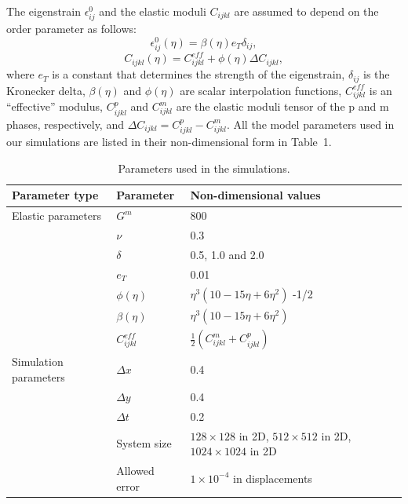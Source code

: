 The eigenstrain $\epsilon_{ij}^{0}$ and the elastic moduli $C_{ijkl}$ are assumed to depend on the order parameter as follows:
\begin{equation}
\epsilon_{ij}^{0}(\eta)=\beta(\eta)e_T\delta_{ij},
\end{equation}
\begin{equation}
C_{ijkl}(\eta)=C_{ijkl}^{eff}+\phi(\eta)\Delta C_{ijkl},
\end{equation}
where $e_T$ is a constant that determines the strength of the eigenstrain, $\delta_{ij}$ is the Kronecker delta, $\beta(\eta)$ and $\phi(\eta)$ are scalar interpolation functions, $C_{ijkl}^{eff}$ is an ``effective'' modulus, $C_{ijkl}^p$ and $C_{ijkl}^m$ are the elastic moduli tensor of the p and m phases, respectively, and $\Delta C_{ijkl}=C_{ijkl}^p-C_{ijkl}^m$. All the model parameters used in our simulations are listed in their non-dimensional form in Table~1.

\begin{table}[ht]
\centering
\caption{Parameters used in the simulations.}
\label{tab:params}
\begin{tabular}{lll}
\hline
\textbf{Parameter type} & \textbf{Parameter} & \textbf{Non-dimensional values} \\
\hline
Elastic parameters & $G^{m}$ & 800 \\
 & $\nu$ & 0.3 \\
 & $\delta$ & 0.5, 1.0 and 2.0 \\
 & $e_T$ & 0.01 \\
 & $\phi(\eta)$ & $\eta^3(10-15\eta+6\eta^2)$ -1/2 \\
 & $\beta(\eta)$ & $\eta^3(10-15\eta+6\eta^2)$ \\
 & $C_{ijkl}^{eff}$ & $\tfrac{1}{2}(C_{ijkl}^m + C_{ijkl}^p)$ \\
\hline
Simulation parameters & $\Delta x$ & 0.4 \\
 & $\Delta y$ & 0.4 \\
 & $\Delta t$ & 0.2 \\
 & System size & $128\times128$ in 2D, $512\times512$ in 2D, $1024\times1024$ in 2D \\
 & Allowed error & $1\times10^{-4}$ in displacements \\
\hline
\end{tabular}
\end{table}

